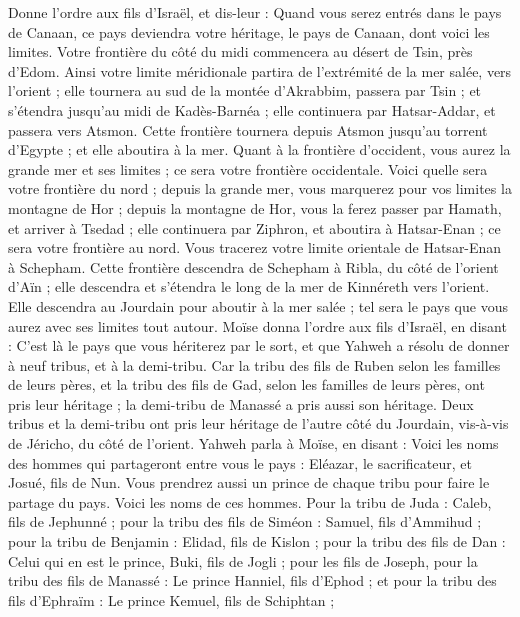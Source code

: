 \begin{multicols}{2}
Donne l’ordre aux fils d'Israël, et dis-leur : Quand vous serez entrés dans le pays de Canaan, ce pays deviendra votre héritage, le pays de Canaan, dont voici les limites.
Votre frontière du côté du midi commencera au désert de Tsin, près d'Edom. Ainsi votre limite méridionale partira de l’extrémité de la mer salée, vers l'orient ;
elle tournera au sud de la montée d’Akrabbim, passera par Tsin ; et s’étendra jusqu’au midi de Kadès-Barnéa ; elle continuera par Hatsar-Addar, et passera vers Atsmon.
Cette frontière tournera depuis Atsmon jusqu'au torrent d'Egypte ; et elle aboutira à la mer.
Quant à la frontière d'occident, vous aurez la grande mer et ses limites ; ce sera votre frontière occidentale.
Voici quelle sera votre frontière du nord ; depuis la grande mer, vous marquerez pour vos limites la montagne de Hor ;
depuis la montagne de Hor, vous la ferez passer par Hamath, et arriver à Tsedad ;
elle continuera par Ziphron, et aboutira à Hatsar-Enan ; ce sera votre frontière au nord.
Vous tracerez votre limite orientale de Hatsar-Enan à Schepham.
Cette frontière descendra de Schepham à Ribla, du côté de l'orient d’Aïn ; elle descendra et s'étendra le long de la mer de Kinnéreth vers l'orient.
Elle descendra au Jourdain pour aboutir à la mer salée ; tel sera le pays que vous aurez avec ses limites tout autour.
Moïse donna l’ordre aux fils d'Israël, en disant : C'est là le pays que vous hériterez par le sort, et que Yahweh a résolu de donner à neuf tribus, et à la demi-tribu.
Car la tribu des fils de Ruben selon les familles de leurs pères, et la tribu des fils de Gad, selon les familles de leurs pères, ont pris leur héritage ; la demi-tribu de Manassé a pris aussi son héritage.
Deux tribus et la demi-tribu ont pris leur héritage de l’autre côté du Jourdain, vis-à-vis de Jéricho, du côté de l’orient.
Yahweh parla à Moïse, en disant :
Voici les noms des hommes qui partageront entre vous le pays : Eléazar, le sacrificateur, et Josué, fils de Nun.
Vous prendrez aussi un prince de chaque tribu pour faire le partage du pays.
Voici les noms de ces hommes. Pour la tribu de Juda : Caleb, fils de Jephunné ;
pour la tribu des fils de Siméon : Samuel, fils d’Ammihud ;
pour la tribu de Benjamin : Elidad, fils de Kislon ;
pour la tribu des fils de Dan : Celui qui en est le prince, Buki, fils de Jogli ;
pour les fils de Joseph, pour la tribu des fils de Manassé : Le prince Hanniel, fils d'Ephod ;
et pour la tribu des fils d'Ephraïm : Le prince Kemuel, fils de Schiphtan ;

\end{multicols}

